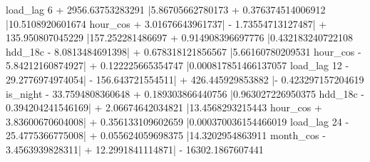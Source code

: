 load_{lag 6} + 2956.63753283291 \left|{5.86705662780173  + 0.376374514006912 \left|{10.5108920601674 hour_{cos} + 3.01676643961737}\right| - 1.73554713127487}\right| + 135.950807045229 \left|{157.252281486697  + 0.914908396697776 \left|{0.432183240722108 hdd_{18c} - 8.0813484691398}\right| + 0.678318121856567 \left|{5.66160780209531 hour_{cos} - 5.84212160874927}\right| + 0.122225665354747 \left|{0.000817851466137057 load_{lag 12} - 29.2776974974054}\right| - 156.643721554511}\right| + 426.445929853882 \left|{- 0.423297157204619 is_{night} - 33.7594808360648  + 0.189303866440756 \left|{0.963027226950375 hdd_{18c} - 0.394204241546169}\right| + 2.06674642034821 \left|{13.4568293215443 hour_{cos} + 3.83600670604008}\right| + 0.356133109602659 \left|{0.000370036154466019 load_{lag 24} - 25.4775366775008}\right| + 0.055624059698375 \left|{14.3202954863911 month_{cos} - 3.4563939828311}\right| + 12.2991841114871}\right| - 16302.1867607441